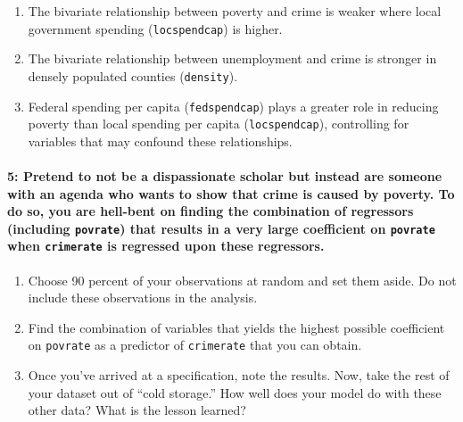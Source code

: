 \documentclass[
]{article}
\begin{document}
\begin{enumerate}
\def\labelenumi{\alph{enumi}.}
\item
  The bivariate relationship between poverty and crime is weaker where
  local government spending (\texttt{locspendcap}) is higher.
\item
  The bivariate relationship between unemployment and crime is stronger
  in densely populated counties (\texttt{density}).
\item
  Federal spending per capita (\texttt{fedspendcap}) plays a greater
  role in reducing poverty than local spending per capita
  (\texttt{locspendcap}), controlling for variables that may confound
  these relationships.
\end{enumerate}

\paragraph{\texorpdfstring{5: Pretend to \textbf{not} be a dispassionate
scholar but instead are someone with an agenda who wants to show that
crime is caused by poverty. To do so, you are hell-bent on finding the
combination of regressors (including \texttt{povrate}) that results in a
very large coefficient on \texttt{povrate} when \texttt{crimerate} is
regressed upon these
regressors.}{5: Pretend to not be a dispassionate scholar but instead are someone with an agenda who wants to show that crime is caused by poverty. To do so, you are hell-bent on finding the combination of regressors (including povrate) that results in a very large coefficient on povrate when crimerate is regressed upon these regressors.}}\label{pretend-to-not-be-a-dispassionate-scholar-but-instead-are-someone-with-an-agenda-who-wants-to-show-that-crime-is-caused-by-poverty.-to-do-so-you-are-hell-bent-on-finding-the-combination-of-regressors-including-povrate-that-results-in-a-very-large-coefficient-on-povrate-when-crimerate-is-regressed-upon-these-regressors.}

\begin{enumerate}
\def\labelenumi{\alph{enumi}.}
\item
  Choose 90 percent of your observations at random and set them aside.
  Do not include these observations in the analysis.
\item
  Find the combination of variables that yields the highest possible
  coefficient on \texttt{povrate} as a predictor of \texttt{crimerate}
  that you can obtain.
\item
  Once you've arrived at a specification, note the results. Now, take
  the rest of your dataset out of ``cold storage.'' How well does your
  model do with these other data? What is the lesson learned?
\end{enumerate}
\end{document}

